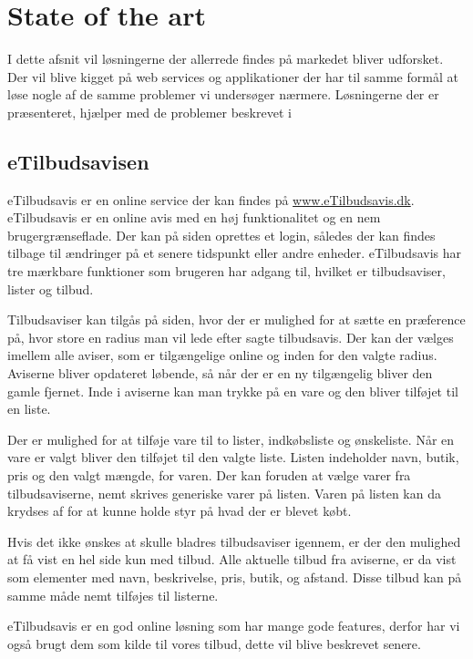 \chapter{State of the art}
I dette afsnit vil løsningerne der allerrede findes på markedet bliver udforsket.
Der vil blive kigget på web services og applikationer der har til samme formål at løse nogle af de samme problemer vi undersøger nærmere.
Løsningerne der er præsenteret, hjælper med de problemer beskrevet i 

\section{eTilbudsavisen}
eTilbudsavis er en online service der kan findes på \underline{www.eTilbudsavis.dk}. eTilbudsavis er en online avis med en høj funktionalitet og en nem brugergrænseflade.
Der kan på siden oprettes et login, således der kan findes tilbage til ændringer på et senere tidspunkt eller andre enheder.
eTilbudsavis har tre mærkbare funktioner som brugeren har adgang til, hvilket er tilbudsaviser, lister og tilbud.

Tilbudsaviser kan tilgås på siden, hvor der er mulighed for at sætte en præference på, hvor store en radius man vil lede efter sagte tilbudsavis. 
Der kan der vælges imellem alle aviser, som er tilgængelige online og inden for den valgte radius. 
Aviserne bliver opdateret løbende, så når der er en ny tilgængelig bliver den gamle fjernet. 
Inde i aviserne kan man trykke på en vare og den bliver tilføjet til en liste.

Der er mulighed for at tilføje vare til to lister, indkøbsliste og ønskeliste. 
Når en vare er valgt bliver den tilføjet til den valgte liste.
Listen indeholder navn, butik, pris og den valgt mængde, for varen. 
Der kan foruden at vælge varer fra tilbudsaviserne, nemt skrives generiske varer på listen. Varen på listen kan da krydses af for at kunne holde styr på hvad der er blevet købt.

Hvis det ikke ønskes at skulle bladres tilbudsaviser igennem, er der den mulighed at få vist en hel side kun med tilbud. 
Alle aktuelle tilbud fra aviserne, er da vist som elementer med navn, beskrivelse, pris, butik, og afstand. Disse tilbud kan på samme måde nemt tilføjes til listerne.

eTilbudsavis er en god online løsning som har mange gode features, derfor har vi også brugt dem som kilde til vores tilbud, dette vil blive beskrevet senere.

